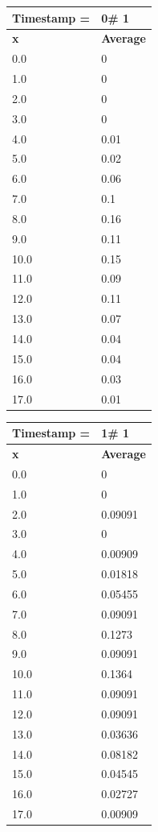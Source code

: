 \begin{tabular}{|l||l|}
\hline
\textbf{Timestamp =} & \textbf{0}\# 1\\\hline
	\textbf{x} & \textbf{Average} \\ \hline
\hline
	0.0 & 0 \\ \hline
	1.0 & 0 \\ \hline
	2.0 & 0 \\ \hline
	3.0 & 0 \\ \hline
	4.0 & 0.01 \\ \hline
	5.0 & 0.02 \\ \hline
	6.0 & 0.06 \\ \hline
	7.0 & 0.1 \\ \hline
	8.0 & 0.16 \\ \hline
	9.0 & 0.11 \\ \hline
	10.0 & 0.15 \\ \hline
	11.0 & 0.09 \\ \hline
	12.0 & 0.11 \\ \hline
	13.0 & 0.07 \\ \hline
	14.0 & 0.04 \\ \hline
	15.0 & 0.04 \\ \hline
	16.0 & 0.03 \\ \hline
	17.0 & 0.01 \\ \hline
\end{tabular}
\begin{tabular}{|l||l|}
\hline
\textbf{Timestamp =} & \textbf{1}\# 1\\\hline
	\textbf{x} & \textbf{Average} \\ \hline
\hline
	0.0 & 0 \\ \hline
	1.0 & 0 \\ \hline
	2.0 & 0.09091 \\ \hline
	3.0 & 0 \\ \hline
	4.0 & 0.00909 \\ \hline
	5.0 & 0.01818 \\ \hline
	6.0 & 0.05455 \\ \hline
	7.0 & 0.09091 \\ \hline
	8.0 & 0.1273 \\ \hline
	9.0 & 0.09091 \\ \hline
	10.0 & 0.1364 \\ \hline
	11.0 & 0.09091 \\ \hline
	12.0 & 0.09091 \\ \hline
	13.0 & 0.03636 \\ \hline
	14.0 & 0.08182 \\ \hline
	15.0 & 0.04545 \\ \hline
	16.0 & 0.02727 \\ \hline
	17.0 & 0.00909 \\ \hline
\end{tabular}

